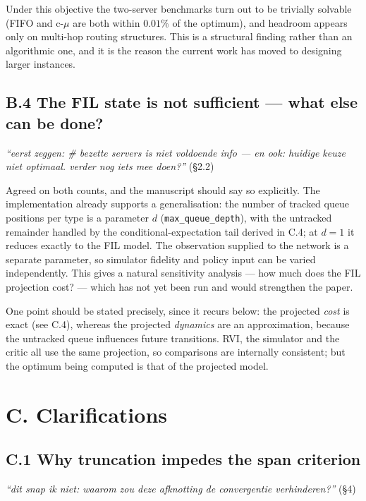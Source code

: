 \documentclass[11pt,a4paper]{article}
\newcommand{\comment}[1]{\textcolor{red!70!black}{\textit{``#1''}}}
\begin{document}
Under this objective the two-server benchmarks turn out to be trivially solvable
(FIFO and c-$\mu$ are both within $0.01\%$ of the optimum), and headroom appears
only on multi-hop routing structures.  This is a structural finding rather than
an algorithmic one, and it is the reason the current work has moved to designing
larger instances.

\subsection*{B.4 The FIL state is not sufficient --- what else can be done?}

\comment{eerst zeggen: \# bezette servers is niet voldoende info --- en ook:
huidige keuze niet optimaal. verder nog iets mee doen?} \hfill (\S2.2)

Agreed on both counts, and the manuscript should say so explicitly.  The
implementation already supports a generalisation: the number of tracked queue
positions per type is a parameter $d$ (\texttt{max\_queue\_depth}), with the
untracked remainder handled by the conditional-expectation tail derived in C.4;
at $d = 1$ it reduces exactly to the FIL model.  The observation supplied to the
network is a separate parameter, so simulator fidelity and policy input can be
varied independently.  This gives a natural sensitivity analysis --- how much does
the FIL projection cost? --- which has not yet been run and would strengthen the
paper.

One point should be stated precisely, since it recurs below: the projected
\emph{cost} is exact (see C.4), whereas the projected \emph{dynamics} are an
approximation, because the untracked queue influences future transitions.  RVI,
the simulator and the critic all use the same projection, so comparisons are
internally consistent; but the optimum being computed is that of the projected
model.

\section*{C. Clarifications}

\subsection*{C.1 Why truncation impedes the span criterion}

\comment{dit snap ik niet: waarom zou deze afknotting de convergentie
verhinderen?} \hfill (\S4)
\end{document}
